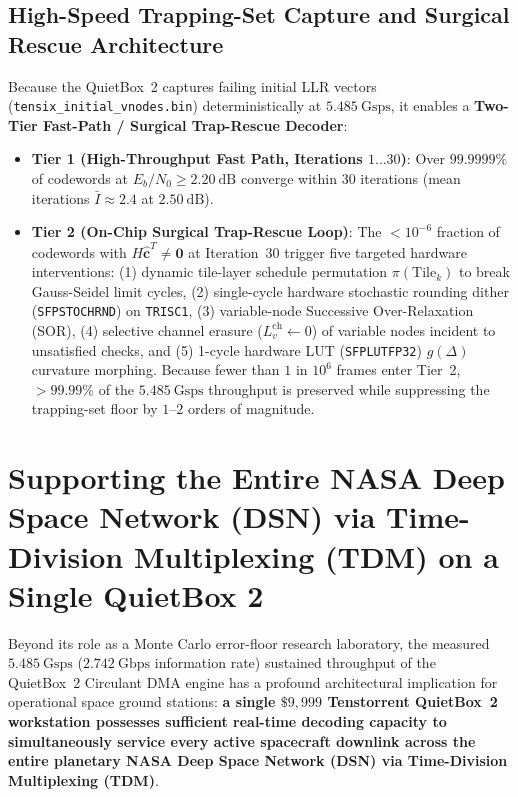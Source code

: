 \documentclass[10pt]{article}
\begin{document}
\subsection{High-Speed Trapping-Set Capture and Surgical Rescue Architecture}

Because the QuietBox~2 captures failing initial LLR vectors (\texttt{tensix\_initial\_vnodes.bin}) deterministically at $5.485\ \mathrm{Gsps}$, it enables a \textbf{Two-Tier Fast-Path / Surgical Trap-Rescue Decoder}:
\begin{itemize}[leftmargin=1.8em, itemsep=2pt]
    \item \textbf{Tier 1 (High-Throughput Fast Path, Iterations $1 \dots 30$)}: Over $99.9999\%$ of codewords at $E_b/N_0 \ge 2.20\ \mathrm{dB}$ converge within 30 iterations (mean iterations $\bar{I} \approx 2.4$ at $2.50\ \mathrm{dB}$).
    \item \textbf{Tier 2 (On-Chip Surgical Trap-Rescue Loop)}: The $<10^{-6}$ fraction of codewords with $H\hat{\mathbf{c}}^T \ne \mathbf{0}$ at Iteration~30 trigger five targeted hardware interventions: (1) dynamic tile-layer schedule permutation $\pi(\mathrm{Tile}_k)$ to break Gauss-Seidel limit cycles, (2) single-cycle hardware stochastic rounding dither (\texttt{SFPSTOCHRND}) on \texttt{TRISC1}, (3) variable-node Successive Over-Relaxation (SOR), (4) selective channel erasure ($L_v^{\mathrm{ch}} \gets 0$) of variable nodes incident to unsatisfied checks, and (5) 1-cycle hardware LUT (\texttt{SFPLUTFP32}) $g(\Delta)$ curvature morphing. Because fewer than $1$ in $10^6$ frames enter Tier~2, $>99.99\%$ of the $5.485\ \mathrm{Gsps}$ throughput is preserved while suppressing the trapping-set floor by $1\text{--}2$ orders of magnitude.
\end{itemize}

\section{Supporting the Entire NASA Deep Space Network (DSN) via Time-Division Multiplexing (TDM) on a Single QuietBox 2}
\label{sec:dsn_tdm}

Beyond its role as a Monte Carlo error-floor research laboratory, the measured $5.485\ \mathrm{Gsps}$ ($2.742\ \mathrm{Gbps}$ information rate) sustained throughput of the QuietBox~2 Circulant DMA engine has a profound architectural implication for operational space ground stations: \textbf{a single $\$9,999$ Tenstorrent QuietBox~2 workstation possesses sufficient real-time decoding capacity to simultaneously service every active spacecraft downlink across the entire planetary NASA Deep Space Network (DSN) via Time-Division Multiplexing (TDM)}.
\end{document}

